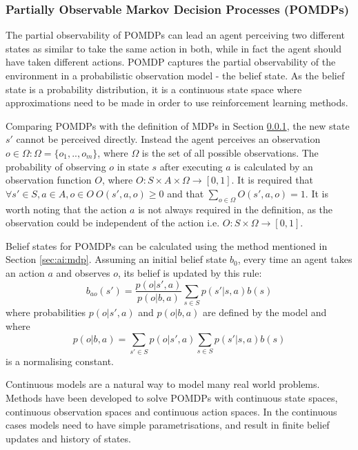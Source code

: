 \subsubsection{Partially Observable Markov Decision Processes (POMDPs)}
\label{sec:ai:pomdp}

The partial observability of POMDPs can lead an agent perceiving two different
states as similar to take the same action in both, while in fact the agent
should have taken different actions. POMDP captures the partial observability
of the environment in a probabilistic observation model - the belief state. As
the belief state is a probability distribution, it is a continuous state space
where approximations need to be made in order to use reinforcement learning
methods. \parencite{Russell2010ai+modern}

Comparing POMDPs with the definition of MDPs in Section \ref{sec:ai:pomdp}, the
new state \(s'\) cannot be perceived directly. Instead the agent perceives an
observation \(o \in \Omega : \Omega = \{o_1,..,o_m\}\), where \(\Omega\) is the
set of all possible observations. The probability of observing \(o\) in state
\(s\) after executing \(a\) is calculated by an observation function \(O\),
where \(O : S \times A \times \Omega \rightarrow [0,1] \). It is required that
\(\forall s' \in S, a \in A, o \in O ~ O (s', a, o) \geq 0 \) and that
\(\sum_{o \in \Omega}^{} O (s', a, o) = 1 \). It is worth noting that the
action \(a\) is not always required in the definition, as the observation could
be independent of the action i.e. \(O : S \times \Omega \rightarrow [0,1] \).
\parencite{Spaan2012ai+pomdp}

Belief states for POMDPs can be calculated using the method mentioned in
Section \ref{sec:ai:mdp}. Assuming an initial belief state \(b_0\), every time
an agent takes an action \(a\) and observes \(o\), its belief is updated by
this rule: \[ b_{ao}(s') = \frac{ p(o|s',a) }{ p(o|b,a) } \sum_{s \in S}
p(s'|s,a) b(s) \] where probabilities \(p(o|s',a)\) and \(p(o|b,a)\) are
defined by the model and where \[p(o|b,a) = \sum_{s' \in S} p(o|s',a) \sum_{s
\in S} p(s'|s,a) b(s) \] is a normalising constant.
\parencite{Spaan2012ai+pomdp}

Continuous models are a natural way to model many real world problems. Methods
have been developed to solve POMDPs with continuous state spaces, continuous
observation spaces and continuous action spaces. In the continuous cases models
need to have simple parametrisations, and result in finite belief updates and
history of states. \parencite{Spaan2012ai+pomdp}

